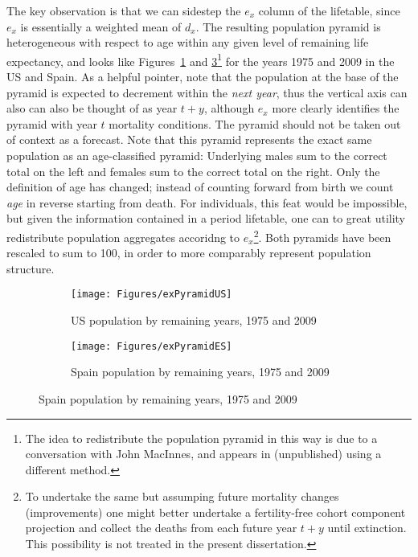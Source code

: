  \FloatBarrier

The key
observation is that we can sidestep the $e_x$ column of the lifetable, since
$e_x$ is essentially a weighted mean of $d_x$. The resulting population pyramid
is heterogeneous with respect to age within any given level of remaining life
expectancy, and looks like
Figures~\ref{fig:exPyrUS} and \ref{fig:exPyrES}\footnote{The idea to
redistribute the population pyramid in this way is due to a conversation with 
John MacInnes, and appears in \citep{MacInnes2013pop} (unpublished) using a
different method.} for the years 1975 and 2009 in the US and Spain. As a helpful
pointer, note that the population at the base of the pyramid is expected to decrement
within the \textit{next year}, thus the vertical axis can also can also be
thought of as year $t+y$, although $e_x$ more clearly identifies the pyramid
with year $t$ mortality conditions. The pyramid should not be
taken out of context as a forecast. Note that this pyramid represents the exact same
population as an age-classified pyramid: Underlying males sum to the correct total on 
the left and females sum to the correct total on the right. Only the definition of age has
changed; instead of counting forward from birth we count \textit{age} in reverse
starting from death. For individuals, this feat would be impossible, but given
 the information contained in a period lifetable,  one can to great utility 
 redistribute population aggregates accoridng to $e_x$\footnote{To undertake
 the same but assumping future mortality changes (improvements) one might
 better undertake a fertility-free cohort component projection and collect the
 deaths from each future year $t+y$ until extinction. This possibility is not
 treated in the present dissertation.}. Both pyramids have been rescaled
 to sum to 100, in order to more comparably represent population structure.

\begin{figure}
        \centering
        \begin{subfigure}
                \centering
                \caption{US population by remaining years, 1975 and 2009}
                \texttt{[image: Figures/exPyramidUS]}
                \label{fig:exPyrUS}
        \end{subfigure}
        \begin{subfigure}
                \centering
                \caption{Spain population by remaining years, 1975 and 2009}
                \texttt{[image: Figures/exPyramidES]}
               
                \label{fig:exPyrES}
        \end{subfigure}
\end{figure}

